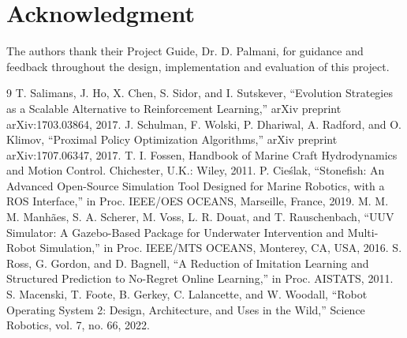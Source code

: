\documentclass[conference]{IEEEtran}
\begin{document}
\section*{Acknowledgment}The authors thank their Project Guide, Dr. D. Palmani, for guidance and feedback throughout the design, implementation and evaluation of this project.
\begin{thebibliography}{9} T. Salimans, J. Ho, X. Chen, S. Sidor, and I. Sutskever, ``Evolution Strategies as a Scalable Alternative to Reinforcement Learning,'' arXiv preprint arXiv:1703.03864, 2017. J. Schulman, F. Wolski, P. Dhariwal, A. Radford, and O. Klimov, ``Proximal Policy Optimization Algorithms,'' arXiv preprint arXiv:1707.06347, 2017. T. I. Fossen, Handbook of Marine Craft Hydrodynamics and Motion Control. Chichester, U.K.: Wiley, 2011. P. Cieślak, ``Stonefish: An Advanced Open-Source Simulation Tool Designed for Marine Robotics, with a ROS Interface,'' in Proc. IEEE/OES OCEANS, Marseille, France, 2019. M. M. M. Manhães, S. A. Scherer, M. Voss, L. R. Douat, and T. Rauschenbach, ``UUV Simulator: A Gazebo-Based Package for Underwater Intervention and Multi-Robot Simulation,'' in Proc. IEEE/MTS OCEANS, Monterey, CA, USA, 2016. S. Ross, G. Gordon, and D. Bagnell, ``A Reduction of Imitation Learning and Structured Prediction to No-Regret Online Learning,'' in Proc. AISTATS, 2011. S. Macenski, T. Foote, B. Gerkey, C. Lalancette, and W. Woodall, ``Robot Operating System 2: Design, Architecture, and Uses in the Wild,'' Science Robotics, vol. 7, no. 66, 2022.\end{thebibliography}
\end{document}
